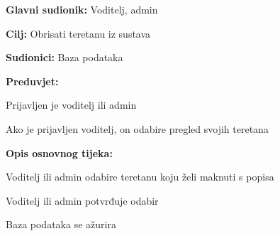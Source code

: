 				\noindent {}
				\begin{packed_item}
					
					\item \textbf{Glavni sudionik: } Voditelj, admin
					\item  \textbf{Cilj:} Obrisati teretanu iz sustava
					\item  \textbf{Sudionici:} Baza podataka
					\item  \textbf{Preduvjet:}
					\item[] \begin{packed_enum}
						
						\item Prijavljen je voditelj ili admin
						\item Ako je prijavljen voditelj, on odabire pregled svojih teretana
						
					\end{packed_enum}
					\item  \textbf{Opis osnovnog tijeka:}
					
					\item[] \begin{packed_enum}
						
						\item Voditelj ili admin odabire teretanu koju želi maknuti s popisa
						
						\item Voditelj ili admin potvrđuje odabir
						
						\item Baza podataka se ažurira
					\end{packed_enum}
					
				\end{packed_item}
				
